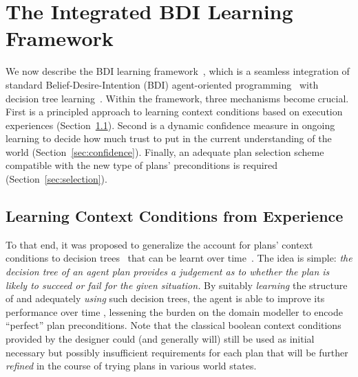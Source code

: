 \section{The Integrated BDI Learning Framework}\label{sec:framework}


We now describe the BDI learning framework~\cite{airiau09:enhancing,singh10:extending,singh10:learning}, which is a seamless integration of standard Belief-Desire-Intention (BDI) agent-oriented programming~\cite{WooldridgeBook} with decision tree learning~\cite{Mitchell97:ML}. 
%
Within the framework, three mechanisms become crucial. First is a principled approach to learning context conditions based on execution experiences (Section~\ref{sec:context}). Second is a dynamic confidence measure in ongoing learning to decide how much trust to put in the current understanding of the world (Section~\ref{sec:confidence}). Finally, an adequate plan selection scheme compatible with the new type of plans' preconditions is required (Section~\ref{sec:selection}).

\subsection{Learning Context Conditions from Experience}\label{sec:context}
To that end, it was proposed to generalize the account for plans' context conditions to decision trees~\cite{Mitchell97:ML} that can be learnt over time~\cite{airiau09:enhancing,singh10:extending,singh10:learning}. The idea is simple: \emph{the decision tree of an agent plan provides a judgement as to whether the plan is likely to succeed or fail for the given situation.}
By suitably \emph{learning} the structure of and adequately \emph{using} such decision trees, the agent is able to improve its performance over time 
, lessening the burden on
the domain modeller to encode ``perfect'' plan preconditions. Note that the classical boolean context conditions provided by the designer could (and generally will) still be used as initial necessary but possibly insufficient requirements for each plan that will be further \emph{refined} in the course of trying plans in various world states.

